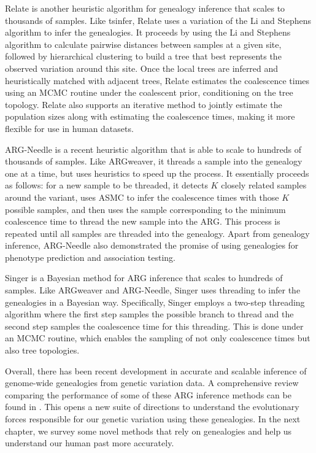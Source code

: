 Relate \cite{Speidel2019} is another heuristic algorithm for genealogy inference that scales to thousands of samples. Like tsinfer, Relate uses a variation of the Li and Stephens algorithm to infer the genealogies. It proceeds by using the Li and Stephens algorithm to calculate pairwise distances between samples at a given site, followed by hierarchical clustering to build a tree that best represents the observed variation around this site. Once the local trees are inferred and heuristically matched with adjacent trees, Relate estimates the coalescence times using an MCMC routine under the coalescent prior, conditioning on the tree topology. Relate also supports an iterative method to jointly estimate the population sizes along with estimating the coalescence times, making it more flexible for use in human datasets.

ARG-Needle \cite{zhang2023biobank} is a recent heuristic algorithm that is able to scale to hundreds of thousands of samples. Like ARGweaver, it threads a sample into the genealogy one at a time, but uses heuristics to speed up the process. It essentially proceeds as follows: for a new sample to be threaded, it detects \(K\) closely related samples around the variant, uses ASMC \cite{palamara2018high} to infer the coalescence times with those \(K\) possible samples, and then uses the sample corresponding to the minimum coalescence time to thread the new sample into the ARG. This process is repeated until all samples are threaded into the genealogy. Apart from genealogy inference, ARG-Needle also demonstrated the promise of using genealogies for phenotype prediction and association testing.

Singer \cite{deng2024robust} is a Bayesian method for ARG inference that scales to hundreds of samples. Like ARGweaver and ARG-Needle, Singer uses threading to infer the genealogies in a Bayesian way. Specifically, Singer employs a two-step threading algorithm where the first step samples the possible branch to thread and the second step samples the coalescence time for this threading. This is done under an MCMC routine, which enables the sampling of not only coalescence times but also tree topologies.

Overall, there has been recent development in accurate and scalable inference of genome-wide genealogies from genetic variation data. A comprehensive review comparing the performance of some of these ARG inference methods can be found in \cite{brandt2022evaluation}. This opens a new suite of directions to understand the evolutionary forces responsible for our genetic variation using these genealogies. In the next chapter, we survey some novel methods that rely on genealogies and help us understand our human past more accurately.

